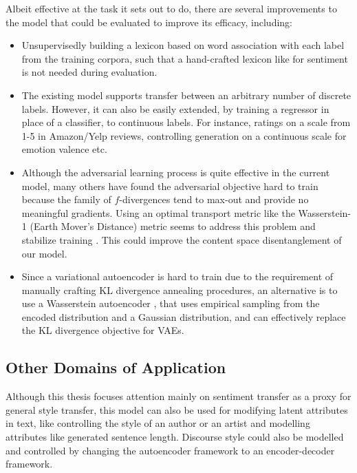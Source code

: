Albeit effective at the task it sets out to do, there are several improvements to the model that could be evaluated to improve its efficacy, including:
\begin{itemize}
	\item Unsupervisedly building a lexicon based on word association with each label from the training corpora, such that a hand-crafted lexicon like \cite{hu2004mining} for sentiment is not needed during evaluation.
	\item The existing model supports transfer between an arbitrary number of discrete labels. However, it can also be easily extended, by training a regressor in place of a classifier, to continuous labels. For instance, ratings on a scale from 1-5 in Amazon/Yelp reviews, controlling generation on a continuous scale for emotion valence etc.
	\item Although the adversarial learning process is quite effective in the current model, many others have found the adversarial objective hard to train because the family of $f$-divergences tend to max-out and provide no meaningful gradients. Using an optimal transport metric like the Wasserstein-1 (Earth Mover's Distance) metric seems to address this problem and stabilize training \citep{arjovsky2017wasserstein, gulrajani2017improved}. This could improve the content space disentanglement of our model.
	\item Since a variational autoencoder is hard to train due to the requirement of manually crafting KL divergence annealing procedures, an alternative is to use a Wasserstein autoencoder \citep{tolstikhin2017wasserstein}, that uses empirical sampling from the encoded distribution and a Gaussian distribution, and can effectively replace the KL divergence objective for VAEs.
\end{itemize}


\subsection{Other Domains of Application}

Although this thesis focuses attention mainly on sentiment transfer as a proxy for general style transfer, this model can also be used for modifying latent attributes in text, like controlling the style of an author or an artist and modelling  attributes like generated sentence length. Discourse style could also be modelled and controlled by changing the autoencoder framework to an encoder-decoder framework.
